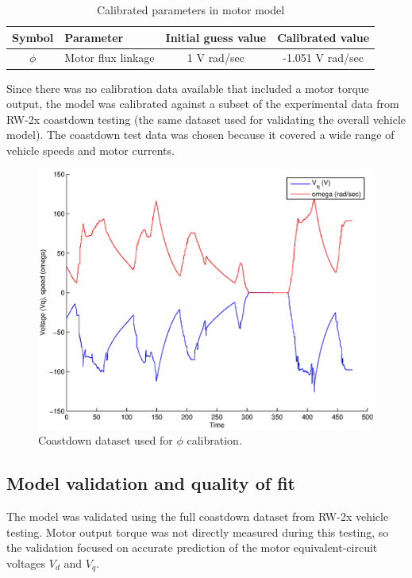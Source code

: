 \documentclass[../SimBALink.tex]{subfiles}
\begin{document}
			\begin{table}
				\centering
				\caption{Calibrated parameters in motor model}
				\label{table:motor_calibrated_parameters}
				\begin{tabular}{c | l | c | c}
					Symbol		&	Parameter			&	Initial guess value	&	Calibrated value	\\
					\hline
					$\phi$		&	Motor flux linkage		&	1 V rad/sec	 	&	-1.051 V rad/sec
				\end{tabular}
			\end{table}
			
			Since there was no calibration data available that included a motor torque output, the model was calibrated against a subset of the experimental data from RW-2x coastdown testing (the same dataset used for validating the overall vehicle model). The coastdown test data was chosen because it covered a wide range of vehicle speeds and motor currents.
			
			\begin{figure}[h]
				\centering
				\includegraphics[width=5in]{228HV_coastdown_calibration_data}
				\caption{Coastdown dataset used for $\phi$ calibration.}
			\end{figure}
			\FloatBarrier
			
	\subsection{Model validation and quality of fit}
		The model was validated using the full coastdown dataset from RW-2x vehicle testing. Motor output torque was not directly measured during this testing, so the validation focused on accurate prediction of the motor equivalent-circuit voltages $V_d$ and $V_q$. 
		
\end{document}
